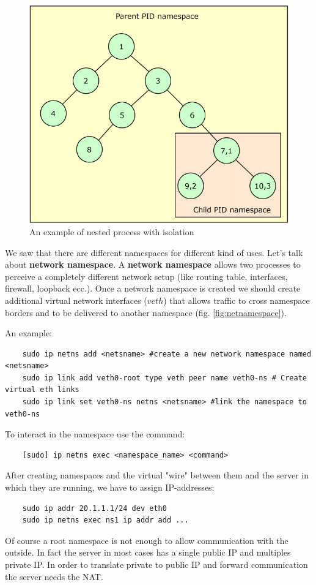 \begin{figure}[h!]
    \centering
    \includegraphics[scale=0.3]{images/processtree.png}
    \caption{An example of nested process with isolation}
    \label{fig:nestedtree}
\end{figure}

We saw that there are different namespaces for different kind of uses. Let's talk about \textbf{network namespace}. A \textbf{network namespace} allows two processes to perceive a completely different network setup (like routing table, interfaces, firewall, loopback ecc.). Once a network namespace is created we should create additional virtual network interfaces ($veth$) that allows traffic to cross namespace borders and to be delivered to another namespace (fig. \ref{fig:netnamespace}).

An example:
\begin{verbatim}
    sudo ip netns add <netsname> #create a new network namespace named <netsname>
    sudo ip link add veth0-root type veth peer name veth0-ns # Create virtual eth links
    sudo ip link set veth0-ns netns <netsname> #link the namespace to veth0-ns
\end{verbatim}
To interact in the namespace use the command:
\begin{verbatim}
    [sudo] ip netns exec <namespace_name> <command>
\end{verbatim}
After creating namespaces and the virtual "wire" between them and the server in which they are running, we have to assign IP-addresses:
\begin{verbatim}
    sudo ip addr 20.1.1.1/24 dev eth0
    sudo ip netns exec ns1 ip addr add ...
\end{verbatim}
Of course a root namespace is not enough to allow communication with the outside. In fact the server in most cases has a single public IP and multiples private IP. In order to translate private to public IP and forward communication the server needs the NAT.

